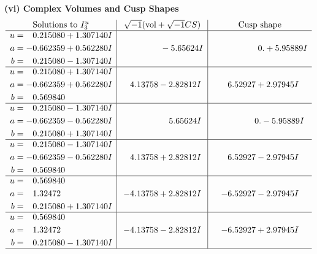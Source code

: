 \documentclass[1p]{elsarticle_modified}
\theoremstyle{definition}
\newcommand{\I}{\sqrt{-1}}
\begin{document}
\newpage\flushleft \textbf{(vi) Complex Volumes and Cusp Shapes}
$$\begin{array}{c|c|c}  
\text{Solutions to }I^u_{3}& \I (\text{vol} + \sqrt{-1}CS) & \text{Cusp shape}\\
 \hline 
\begin{aligned}
u &= \phantom{-}0.215080 + 1.307140 I \\
a &= -0.662359 + 0.562280 I \\
b &= \phantom{-}0.215080 - 1.307140 I\end{aligned}
 & \phantom{-0.000000 } -5.65624 I & \phantom{-0.000000 -}0. + 5.95889 I \\ \hline\begin{aligned}
u &= \phantom{-}0.215080 + 1.307140 I \\
a &= -0.662359 + 0.562280 I \\
b &= \phantom{-}0.569840\phantom{ +0.000000I}\end{aligned}
 & \phantom{-}4.13758 - 2.82812 I & \phantom{-}6.52927 + 2.97945 I \\ \hline\begin{aligned}
u &= \phantom{-}0.215080 - 1.307140 I \\
a &= -0.662359 - 0.562280 I \\
b &= \phantom{-}0.215080 + 1.307140 I\end{aligned}
 & \phantom{-0.000000 -}5.65624 I & \phantom{-0.000000 } 0. - 5.95889 I \\ \hline\begin{aligned}
u &= \phantom{-}0.215080 - 1.307140 I \\
a &= -0.662359 - 0.562280 I \\
b &= \phantom{-}0.569840\phantom{ +0.000000I}\end{aligned}
 & \phantom{-}4.13758 + 2.82812 I & \phantom{-}6.52927 - 2.97945 I \\ \hline\begin{aligned}
u &= \phantom{-}0.569840\phantom{ +0.000000I} \\
a &= \phantom{-}1.32472\phantom{ +0.000000I} \\
b &= \phantom{-}0.215080 + 1.307140 I\end{aligned}
 & -4.13758 + 2.82812 I & -6.52927 - 2.97945 I \\ \hline\begin{aligned}
u &= \phantom{-}0.569840\phantom{ +0.000000I} \\
a &= \phantom{-}1.32472\phantom{ +0.000000I} \\
b &= \phantom{-}0.215080 - 1.307140 I\end{aligned}
 & -4.13758 - 2.82812 I & -6.52927 + 2.97945 I\\
 \hline 
 \end{array}$$\newpage
\end{document}
